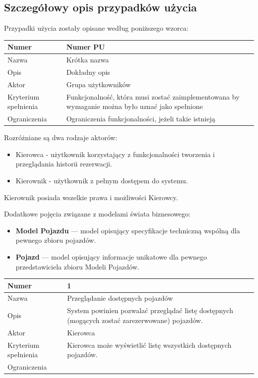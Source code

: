 \documentclass[eng,printmode,openany]{mgr}
\begin{document}
	\subsection{Szczegółowy opis przypadków użycia}
		Przypadki użycia zostały opisane według poniższego wzorca:
	\begin{table}[H]
		\begin{tabularx}{\textwidth}{|l|X|}
			\hline
			Numer                & Numer PU \\ \hline
			Nazwa                & Krótka nazwa\\ \hline
			Opis                 & Dokładny opis\\ \hline
			Aktor                & Grupa użytkowników\\ \hline
			Kryterium spełnienia & Funkcjonalność, która musi zostać zaimplementowana by wymaganie można było uznać jako spełnione\\ \hline
			Ograniczenia         & Ograniczenia funkcjonalności, jeżeli takie istnieją\\ \hline
		\end{tabularx}
	\end{table}
	Rozróżniane są dwa rodzaje aktorów:
	\begin{itemize}
		\item Kierowca - użytkownik korzystający z funkcjonalności tworzenia i przeglądania historii rezerwacji.
		\item Kierownik - użytkownik z pełnym dostępem do systemu.
	\end{itemize}
	Kierownik posiada wszelkie prawa i możliwości Kierowcy.
	
	Dodatkowe pojęcia związane z modelami świata biznesowego:
	\begin{itemize}
		\item \textbf{Model Pojazdu} — model opisujący specyfikacje techniczną wspólną dla pewnego zbioru pojazdów.
		\item \textbf{Pojazd} — model opisujący informacje unikatowe dla pewnego przedstawiciela zbioru Modeli Pojazdów.
	\end{itemize}
	
	\begin{table}[H]
		\begin{tabularx}{\textwidth}{|l|X|}
			\hline
			Numer                & 1  \\ \hline
			Nazwa                & Przeglądanie dostępnych pojazdów \\ \hline
			Opis                 & System powinien pozwalać przeglądać listę dostępnych (mogących zostać zarezerwowane) pojazdów. \\ \hline
			Aktor                & Kierowca \\ \hline
			Kryterium spełnienia & Kierowca może wyświetlić listę wszystkich dostępnych pojazdów. \\ \hline
			Ograniczenia         &  \\ \hline
		\end{tabularx}
	\end{table}
	
\end{document}
